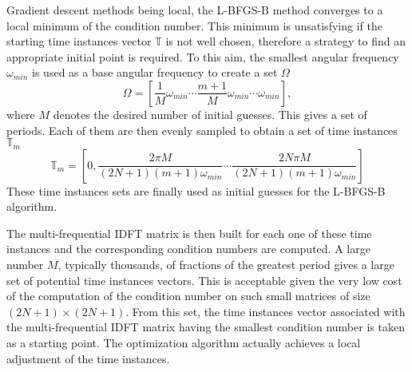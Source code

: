 Gradient descent methods being local, the L-BFGS-B method converges to a local
minimum of the condition number. This minimum is unsatisfying if the
starting time instances vector $\mathbb{T}$ is not well chosen, therefore a strategy
to find an appropriate initial point is required. To this aim, the smallest
angular frequency $\omega_{min}$ is used as a base angular frequency to create a set $\Omega$
\begin{equation}
    \Omega = [\frac{1}{M} \omega_{min} \cdots \frac{m+1}{M} \omega_{min} \cdots \omega_{min}],
    \label{eq:slitted_period}
\end{equation}
where $M$ denotes the desired number of initial guesses.
This gives a set of periods. Each of them are then evenly sampled to obtain a
set of time instances $\mathbb{T}_m$
\begin{equation}
    \mathbb{T}_m = \left[ 0, \frac{2 \pi M}{ (2N + 1) (m+1) \omega_{min}} \cdots 
                             \frac{2N \pi M}{ (2N + 1) (m+1) \omega_{min}} \right]
    \label{eq:set_of_tlv}
\end{equation}
These time instances sets are finally used as initial guesses for the
L-BFGS-B algorithm.

The multi-frequential IDFT matrix is then built for
each one of these time instances and the corresponding condition numbers are
computed. A large number $M$, typically thousands, of fractions of the
greatest period gives a large set of potential time instances vectors.
This is acceptable given the very low cost of the computation of the
condition number on such small matrices of size $(2N + 1) \times
(2N+1)$.  From this set, the time instances vector associated with the
multi-frequential IDFT matrix having the smallest condition number is
taken as a starting point.  The optimization algorithm actually achieves
a local adjustment of the time instances.

